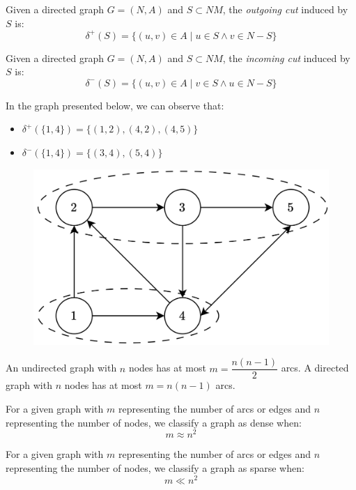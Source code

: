 \begin{definition}
    Given a directed graph $G=(N,A)$ and $S \subset NM$, the \emph{outgoing cut} induced by $S$ is:
    \[ \delta^{+}(S)=\{(u,v) \in A \mid u \in S \land v \in N-S \} \]
\end{definition}
\begin{definition}
    Given a directed graph $G=(N,A)$ and $S \subset NM$, the \emph{incoming cut} induced by $S$ is:
    \[ \delta^{-}(S)=\{(u,v) \in A \mid v \in S \land u \in N-S \} \]
\end{definition}
\begin{example}
    In the graph presented below, we can observe that:
    \begin{itemize}
        \item $\delta^{+}(\{1,4\})=\{(1,2),(4,2),(4,5)\}$
        \item $\delta^{-}(\{1,4\})=\{(3,4),(5,4)\}$
    \end{itemize}
    \begin{figure}[H]
        \centering
        \includegraphics[width=0.4\linewidth]{images/cuts.png}
    \end{figure}
\end{example}
An undirected graph with $n$ nodes has at most $m=\dfrac{n(n-1)}{2}$ arcs. 
A directed graph with $n$ nodes has at most $m=n(n-1)$ arcs.
\begin{definition}
    For a given graph with $m$ representing the number of arcs or edges and $n$ representing the number of nodes, we classify a graph as dense when:
    \[m \approx n^2\]
\end{definition}
\begin{definition}
    For a given graph with $m$ representing the number of arcs or edges and $n$ representing the number of nodes, we classify a graph as sparse when:
    \[m \ll n^2\]
\end{definition}

